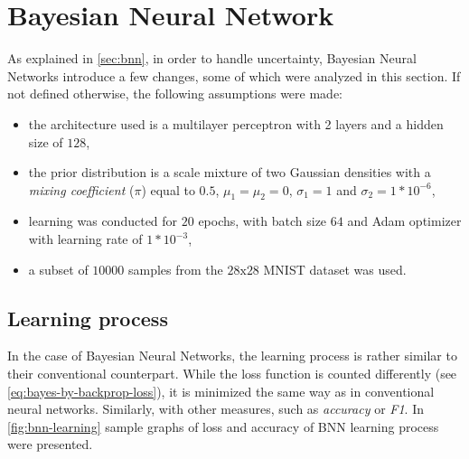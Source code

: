 \section{Bayesian Neural Network}
As explained in \autoref{sec:bnn}, in order to handle uncertainty, Bayesian Neural Networks introduce a few changes, some of which were analyzed in this section. If not defined otherwise, the following assumptions were made:
\begin{itemize}
    \item the architecture used is a multilayer perceptron with 2 layers and a hidden size of $128$,
    \item the prior distribution is a scale mixture of two Gaussian densities \cite{Blundell2015} with a \textit{mixing coefficient} ($\pi$) equal to $0.5$, $\mu_1 = \mu_2 = 0$, $\sigma_1 = 1$ and $\sigma_2 = 1*10^{-6}$,
    \item learning was conducted for $20$ epochs, with batch size $64$ and Adam optimizer with learning rate of $1*10^{-3}$,
    \item a subset of $10000$ samples from the $28\textrm{x}28$ MNIST dataset was used.
\end{itemize}

\subsection{Learning process}
In the case of Bayesian Neural Networks, the learning process is rather similar to their conventional counterpart. While the loss function is counted differently (see \autoref{eq:bayes-by-backprop-loss}), it is minimized the same way as in conventional neural networks. Similarly, with other measures, such as \textit{accuracy} or \textit{F1}. In \autoref{fig:bnn-learning} sample graphs of loss and accuracy of BNN learning process were presented.


